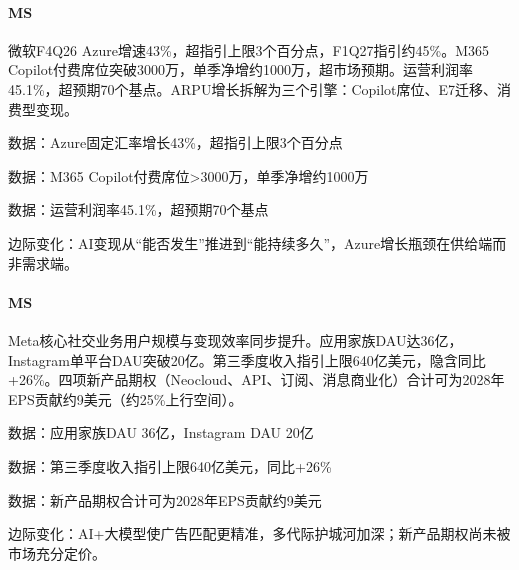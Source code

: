 \documentclass[11pt]{ctexart}
\begin{document}
\paragraph{MS} 微软F4Q26 Azure增速43\%，超指引上限3个百分点，F1Q27指引约45\%。M365 Copilot付费席位突破3000万，单季净增约1000万，超市场预期。运营利润率45.1\%，超预期70个基点。ARPU增长拆解为三个引擎：Copilot席位、E7迁移、消费型变现。
{\small\color{refgray}数据：Azure固定汇率增长43\%，超指引上限3个百分点\par}
{\small\color{refgray}数据：M365 Copilot付费席位>3000万，单季净增约1000万\par}
{\small\color{refgray}数据：运营利润率45.1\%，超预期70个基点\par}
{\small\color{refgray}边际变化：AI变现从“能否发生”推进到“能持续多久”，Azure增长瓶颈在供给端而非需求端。\par}
\paragraph{MS} Meta核心社交业务用户规模与变现效率同步提升。应用家族DAU达36亿，Instagram单平台DAU突破20亿。第三季度收入指引上限640亿美元，隐含同比+26\%。四项新产品期权（Neocloud、API、订阅、消息商业化）合计可为2028年EPS贡献约9美元（约25\%上行空间）。
{\small\color{refgray}数据：应用家族DAU 36亿，Instagram DAU 20亿\par}
{\small\color{refgray}数据：第三季度收入指引上限640亿美元，同比+26\%\par}
{\small\color{refgray}数据：新产品期权合计可为2028年EPS贡献约9美元\par}
{\small\color{refgray}边际变化：AI+大模型使广告匹配更精准，多代际护城河加深；新产品期权尚未被市场充分定价。\par}
\end{document}
